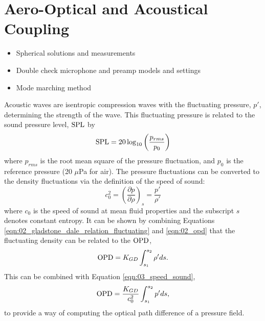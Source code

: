 
\chapter{Aero-Optical and Acoustical Coupling}
\label{chap:03}

\begin{itemize}
  \color{red}
  \item Spherical solutions and measurements
  \item Double check microphone and preamp models and settings
  \item Mode marching method
\end{itemize}


Acoustic waves are isentropic compression waves with the fluctuating pressure, $p'$, determining the strength of the wave.
This fluctuating pressure is related to the sound pressure level, $\operatorname{SPL}$ by
\begin{equation}
  \operatorname{SPL} = 20\log_{10}\left(\frac{p_{rms}}{p_0}\right)
  \label{eqn:03_spl}
\end{equation}
where $p_{rms}$ is the root mean square of the pressure fluctuation, and $p_0$ is the reference pressure (20 $\mu$Pa for air).
The pressure fluctuations can be converted to the density fluctuations via the definition of the speed of sound:
\begin{equation}
  c_0^2 = \left(\frac{\partial p}{\partial \rho}\right)_s=\frac{p'}{\rho'}
  \label{eqn:03_speed_sound}
\end{equation}
where $c_0$ is the speed of sound at mean fluid properties and the subscript $s$ denotes constant entropy.
It can be shown by combining Equations \ref{eqn:02_gladstone_dale_relation_fluctuating} and \ref{eqn:02_opd} that the fluctuating density can be related to the $\operatorname{OPD}$,
\begin{equation}
  \operatorname{OPD} = K_{GD}\int_{s_1}^{s_2}{\rho'}ds \textrm{.}
  \label{eqn:03_opd_fluct}
\end{equation}
This can be combined with Equation \ref{eqn:03_speed_sound},
\begin{equation}
  \operatorname{OPD} = \frac{K_{GD}}{c_0^2}\int_{s_1}^{s_2}{p'}ds \textrm{,}
  \label{eqn:03_opd_pressure}
\end{equation}
to provide a way of computing the optical path difference of a pressure field.


